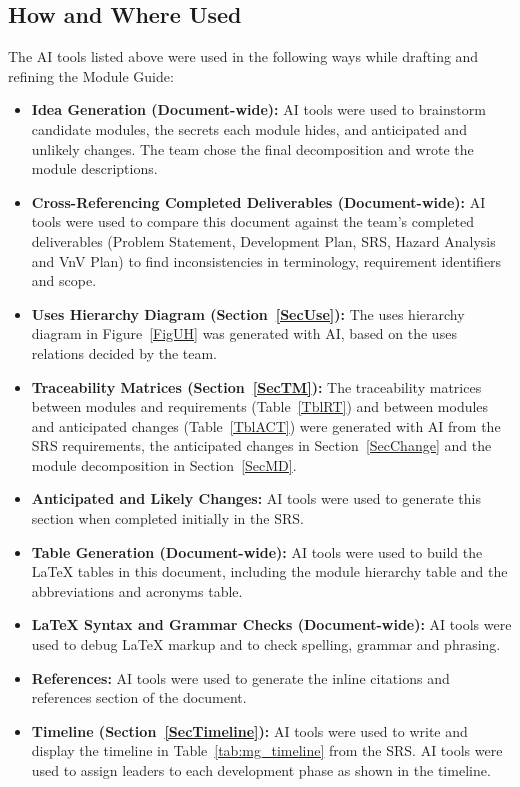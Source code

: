\documentclass[12pt, titlepage]{article}
\begin{document}
\subsection{How and Where Used}

The AI tools listed above were used in the following ways while drafting and
refining the Module Guide:
\begin{itemize}
    \item \textbf{Idea Generation (Document-wide):} AI tools were used to
    brainstorm candidate modules, the secrets each module hides, and anticipated
    and unlikely changes. The team chose the final decomposition and wrote
    the module descriptions.
    \item \textbf{Cross-Referencing Completed Deliverables (Document-wide):}
    AI tools were used to compare this document against the team's completed
    deliverables (Problem Statement, Development Plan, SRS, Hazard Analysis
    and VnV Plan) to find inconsistencies in terminology, requirement
    identifiers and scope.
    \item \textbf{Uses Hierarchy Diagram (Section~\ref{SecUse}):} The uses
    hierarchy diagram in Figure~\ref{FigUH} was generated with AI, based on
    the uses relations decided by the team.
    \item \textbf{Traceability Matrices (Section~\ref{SecTM}):} The
    traceability matrices between modules and requirements
    (Table~\ref{TblRT}) and between modules and anticipated changes
    (Table~\ref{TblACT}) were generated with AI from the SRS requirements,
    the anticipated changes in Section~\ref{SecChange} and the module
    decomposition in Section~\ref{SecMD}.
    \item \textbf{Anticipated and Likely Changes:} AI tools were used to generate this
    section when completed initially in the SRS.
    \item \textbf{Table Generation (Document-wide):} AI tools were used to
    build the LaTeX tables in this document, including the module
    hierarchy table and the abbreviations and acronyms table.
    \item \textbf{LaTeX Syntax and Grammar Checks (Document-wide):} AI tools
    were used to debug LaTeX markup and to check spelling, grammar and
    phrasing.
    \item \textbf{References:} AI tools were used to generate the inline citations 
    and references section of the document.
    \item \textbf{Timeline (Section~\ref{SecTimeline}):} AI tools were used to write and display
    the timeline in Table~\ref{tab:mg_timeline} from the SRS. AI tools were used to assign leaders 
    to each development phase as shown in the timeline.
\end{itemize}
\end{document}
